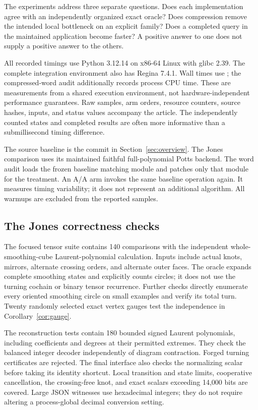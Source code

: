 \documentclass[11pt]{article}
\theoremstyle{definition}
\theoremstyle{remark}
\newcommand{\code}[1]{\texttt{\detokenize{#1}}}
\begin{document}
The experiments address three separate questions. Does each implementation
agree with an independently organized exact oracle? Does compression remove
the intended local bottleneck on an explicit family? Does a completed query
in the maintained application become faster? A positive answer to one does
not supply a positive answer to the others.

All recorded timings use Python 3.12.14 on x86-64 Linux with glibc 2.39.
The complete integration environment also has Regina 7.4.1. Wall times use
\code{perf_counter}; the compressed-word audit additionally records process
CPU time. These are measurements from a shared execution environment, not
hardware-independent performance guarantees. Raw samples, arm orders,
resource counters, source hashes, inputs, and status values accompany the
article. The independently counted states and completed results are often
more informative than a submillisecond timing difference.

The source baseline is the commit in Section~\ref{sec:overview}. The Jones
comparison uses its maintained faithful full-polynomial Potts backend.
The word audit loads the frozen baseline matching module and patches only
that module for the treatment. An A/A arm invokes the same baseline
operation again. It measures timing variability; it does not represent
an additional algorithm. All warmups are excluded from the reported samples.

\subsection{The Jones correctness checks}

The focused tensor suite contains 140 comparisons with the independent
whole-smoothing-cube Laurent-polynomial calculation. Inputs include actual
knots, mirrors, alternate crossing orders, and alternate outer faces.
The oracle expands complete smoothing states and explicitly counts circles;
it does not use the turning cochain or binary tensor recurrence.
Further checks directly enumerate every oriented smoothing circle on small
examples and verify its total turn. Twenty randomly selected exact vertex
gauges test the independence in Corollary~\ref{cor:gauge}.

The reconstruction tests contain 180 bounded signed Laurent polynomials,
including coefficients and degrees at their permitted extremes. They check
the balanced integer decoder independently of diagram contraction. Forged
turning certificates are rejected. The final interface also checks the
normalizing scalar before taking its identity shortcut. Local transition
and state limits, cooperative cancellation, the crossing-free knot,
and exact scalars exceeding 14,000 bits are covered. Large JSON witnesses
use hexadecimal integers; they do not require altering a process-global
decimal conversion setting.
\end{document}
